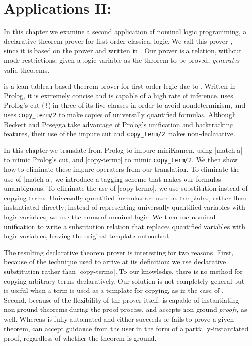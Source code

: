 \chapter{Applications II:  \alphatap}\label{alphatapchapter}

In this chapter we examine a second application of nominal logic
programming, a declarative theorem prover for first-order classical
logic. We call this prover \alphatap, since it is based on the
\leantapsp\cite{beckert95leantap} prover and written in
\alphakanren. Our prover is a relation, without mode restrictions;
given a logic variable as the theorem to be proved, \alphatapsp
\textit{generates} valid theorems.

\leantapsp is a lean tableau-based theorem prover for first-order
logic due to \citet{beckert95leantap}.  Written in
Prolog, it is extremely concise and is capable of a high rate of
inference. \leantapsp uses Prolog's cut (\texttt{!}) in three of its
five clauses in order to avoid nondeterminism, and uses
\mbox{\texttt{copy\_term/2}} to make copies of universally quantified
formulas. Although Beckert and Posegga take advantage of Prolog's
unification and backtracking features, their use of the impure cut and
\mbox{\texttt{copy\_term/2}} makes \leantapsp non-declarative.



In this chapter we translate \leantapsp from Prolog to impure
miniKanren, using \scheme|match-a| to mimic Prolog's cut, and
\scheme|copy-termo| to mimic \mbox{\texttt{copy\_term/2}}.  We then show how
to eliminate these impure operators from our translation. To eliminate the
use of \scheme|match-a|, we introduce a tagging scheme that makes our
formulas unambiguous.  To eliminate the use of \scheme|copy-termo|, we
use substitution instead of copying terms.  Universally quantified
formulas are used as templates, rather than instantiated directly;
instead of representing universally quantified variables with logic
variables, we use the noms of nominal logic. We then use nominal
unification to write a substitution relation that replaces quantified
variables with logic variables, leaving the original template
untouched.

The resulting declarative theorem prover is interesting for two
reasons. First, because of the technique used to arrive at its
definition: we use declarative substitution rather than
\scheme|copy-termo|.  To our knowledge, there is no method for
copying arbitrary terms declaratively. Our solution is not completely
general but is useful when a term is used as a template for copying,
as in the case of \leantap.  Second, because of the flexibility of the
prover itself: \alphatapsp is capable of instantiating non-ground
theorems during the proof process, and accepts non-ground
\textit{proofs}, as well.  Whereas \leantapsp is fully automated and
either succeeds or fails to prove a given theorem, \alphatapsp can
accept guidance from the user in the form of a partially-instantiated
proof, regardless of whether the theorem is ground.

